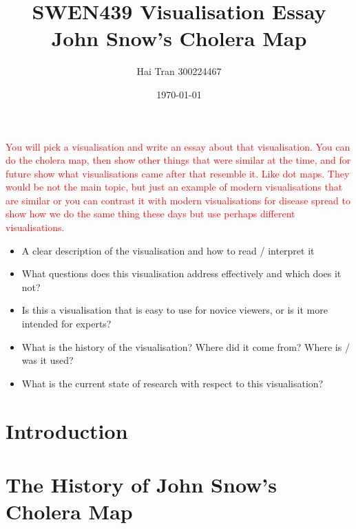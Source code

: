 \documentclass[12pt]{article}
\title{SWEN439 Visualisation Essay \\ John Snow's Cholera Map}
\author{Hai Tran 300224467}
\date{\today}
\begin{document}
\maketitle 

\begin{abstract}

\end{abstract}
\textcolor{red}{
You will pick a visualisation and write an essay about that visualisation. 
You can do the cholera map, then show other things that were similar at the time, and for future show what visualisations came after that resemble it. Like dot maps. They would be not the main topic, but just an example of modern visualisations that are similar or you can contrast it with modern visualisations for disease spread to show how we do the same thing these days but use perhaps different visualisations.
}

\begin{itemize}
\item A clear description of the visualisation and how to read / interpret it
\item What questions does this visualisation address effectively and which does it not?
\item Is this a visualisation that is easy to use for novice viewers, or is it more intended for experts?
\item What is the history of the visualisation? Where did it come from? Where is / was it used?
\item What is the current state of research with respect to this visualisation?
\end{itemize}

\section{Introduction}

\section{The History of John Snow's Cholera Map}
\end{document}
